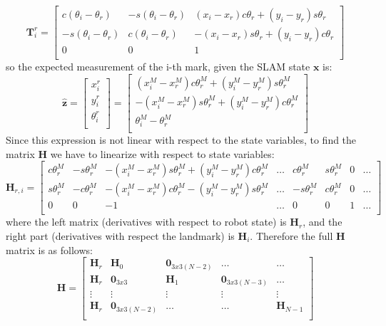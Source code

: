 \begin{equation}
 \mathbf{T}^r_i = 
 \left[
 \begin{array}{ccc}
 c(\theta_i-\theta_r) & -s(\theta_i-\theta_r) & 
 (x_i-x_r)c\theta_r + (y_i-y_r)s\theta_r \\
 -s(\theta_i-\theta_r) & c(\theta_i-\theta_r) & 
 -(x_i-x_r)s\theta_r + (y_i-y_r)c\theta_r \\
 0 & 0 & 1\\
 \end{array}
\right]
\end{equation}
so the expected measurement of the i-th mark, given the SLAM state $\mathbf{x}$ is: 
\begin{equation}
 \hat{\mathbf{z}} = 
 \left[
 \begin{array}{c}
 x^r_i \\
 y^r_i \\
 \theta^r_i \\
 \end{array}
\right] 
=
\left[
 \begin{array}{c}
 (x^M_i-x^M_r)c\theta^M_r + (y^M_i-y^M_r)s\theta^M_r \\
 -(x^M_i-x^M_r)s\theta^M_r + (y^M_i-y^M_r)c\theta^M_r \\
 \theta^M_i - \theta^M_r\\
 \end{array}
\right]
\end{equation}
Since this expression is not linear with respect to the state variables, to find the matrix $\mathbf{H}$ we have to linearize with respect to state variables:
\begin{equation}
 \mathbf{H}_{r,i} = 
 \left[
 \begin{array}{cccccccc}
 c\theta^M_r & -s\theta^M_r & -(x^M_i-x^M_r)s\theta^M_r + (y^M_i-y^M_r)c\theta^M_r & \dots & c\theta^M_r & s\theta^M_r & 0 & \dots\\
 s\theta^M_r & -c\theta^M_r & -(x^M_i-x^M_r)c\theta^M_r - (y^M_i-y^M_r)s\theta^M_r & \dots & -s\theta^M_r & c\theta^M_r & 0 & \dots \\
 0 & 0 & -1 & \dots & 0 & 0 & 1 & \dots\\
 \end{array}
\right] 
\end{equation}
where the left matrix (derivatives with respect to robot state) is $\mathbf{H}_r$, and the right part (derivatives with respect the landmark) is $\mathbf{H}_i$. Therefore the full $\mathbf{H}$ matrix is as follows:
\begin{equation}
 \mathbf{H} = 
 \left[
 \begin{array}{ccccc}
 \mathbf{H}_r & \mathbf{H}_0 & \mathbf{0}_{3x3(N-2)} & \dots & \dots \\
 \mathbf{H}_r & \mathbf{0}_{3x3} & \mathbf{H}_1 & \mathbf{0}_{3x3(N-3)} & \dots \\
 \vdots & \vdots & \vdots & \vdots & \vdots \\
 \mathbf{H}_r & \mathbf{0}_{3x3(N-2)} & \dots & \dots & \mathbf{H}_{N-1} \\
 \end{array}
\right] 
\end{equation}

